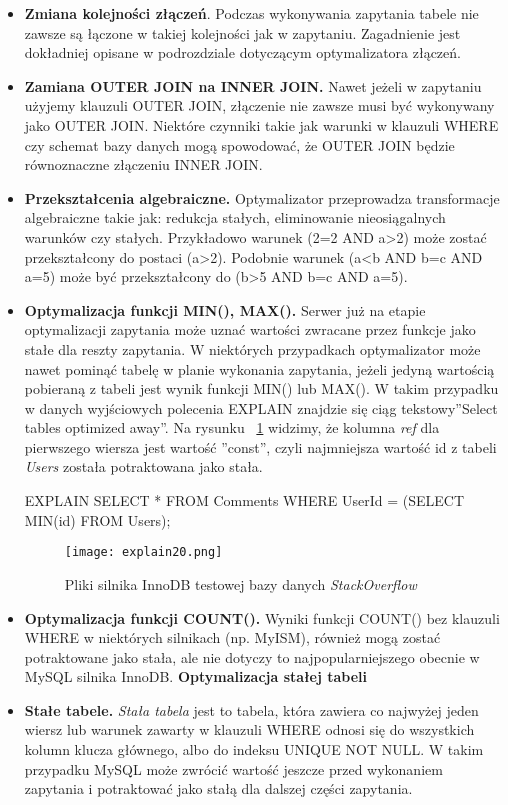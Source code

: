 \begin{itemize}
	\item \textbf{Zmiana kolejności złączeń}. Podczas wykonywania zapytania tabele nie zawsze są łączone w takiej kolejności jak w zapytaniu. Zagadnienie jest dokładniej opisane w podrozdziale dotyczącym optymalizatora złączeń.
	\item \textbf{Zamiana OUTER JOIN na INNER JOIN.} Nawet jeżeli w zapytaniu użyjemy klauzuli OUTER JOIN, złączenie nie zawsze musi być wykonywany jako OUTER JOIN. Niektóre czynniki takie jak warunki w klauzuli WHERE czy schemat bazy danych mogą spowodować, że OUTER JOIN będzie równoznaczne złączeniu INNER JOIN. 
	\item \textbf{Przekształcenia algebraiczne.} Optymalizator przeprowadza transformacje algebraiczne takie jak: redukcja stałych, eliminowanie nieosiągalnych warunków czy stałych. Przykładowo warunek (2=2 AND a>2) może zostać przekształcony do postaci (a>2). Podobnie warunek (a<b AND b=c AND a=5) może być przekształcony do (b>5 AND b=c AND a=5).
	\item \textbf{Optymalizacja funkcji MIN(), MAX().}
	Serwer już na etapie optymalizacji zapytania może uznać wartości zwracane przez funkcje jako stałe dla reszty zapytania. W niektórych przypadkach optymalizator może nawet pominąć tabelę w planie wykonania zapytania, jeżeli jedyną wartością pobieraną z tabeli jest wynik funkcji MIN() lub MAX(). W takim przypadku w danych wyjściowych polecenia EXPLAIN znajdzie się ciąg tekstowy''Select tables optimized away''.
	Na rysunku ~\ref{fig:explain20} widzimy, że kolumna \textit{ref} dla pierwszego wiersza jest wartość ''const'', czyli najmniejsza wartość id z tabeli \textit{Users} została potraktowana jako stała.
	\begin{spverbatim}
		EXPLAIN SELECT * FROM Comments WHERE UserId = (SELECT MIN(id) FROM Users);
	\end{spverbatim}
\begin{figure}
	\caption{Pliki silnika InnoDB testowej bazy danych \textit{StackOverflow}}
	\centering
	\texttt{[image: explain20.png]}
	\label{fig:explain20}
\end{figure}
	\item \textbf{Optymalizacja funkcji COUNT().} Wyniki funkcji COUNT() bez klauzuli WHERE w niektórych silnikach (np. MyISM), również mogą zostać potraktowane jako stała, ale nie dotyczy to najpopularniejszego obecnie w MySQL silnika InnoDB.
	\textbf{Optymalizacja stałej tabeli}
	
	\item \textbf{Stałe tabele.} \textit{Stała tabela} jest to tabela, która zawiera co najwyżej jeden wiersz lub warunek zawarty w klauzuli WHERE odnosi się do wszystkich kolumn klucza głównego, albo do indeksu UNIQUE NOT NULL. W takim przypadku MySQL może zwrócić wartość jeszcze przed wykonaniem zapytania i potraktować jako stałą dla dalszej części zapytania.
\end{itemize}

